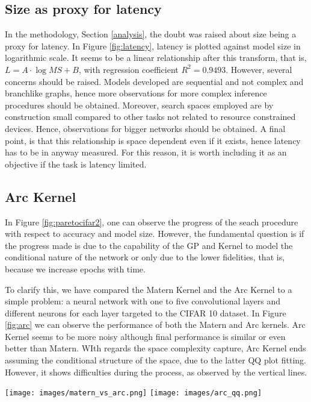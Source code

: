 \documentclass[10pt, a4paper, twocolumn]{article}
\begin{document}
\subsection{Size as proxy for latency}

In the methodology, Section \ref{analysis}, the doubt was raised about size being a proxy for latency. In Figure \ref{fig:latency}, latency is plotted against model size in logarithmic scale. It seems to be a linear relationship after this transform, that is, $L = A\cdot \log{MS} + B$, with regression coefficient $R^{2} = 0.9493$. However, several concerns should be raised. Models developed are sequential and not complex and branchlike graphs, hence more observations for more complex inference procedures should be obtained. Moreover, search spaces employed are by construction small compared to other tasks not related to resource constrained devices. Hence, observations for bigger networks should be obtained. A final point, is that this relationship is space dependent even if it exists, hence latency has to be in anyway measured. For this reason, it is worth including it as an objective if the task is latency limited.




\subsection{Arc Kernel}

In Figure \ref{fig:paretocifar2}, one can observe the progress of the seach procedure with respect to accuracy and model size. However, the fundamental question is if the progress made is due to the capability of the GP and Kernel to model the conditional nature of the network or only due to the lower fidelities, that is, because we increase epochs with time. 

To clarify this, we have compared the Matern Kernel and  the Arc Kernel to a simple problem: a neural network with one to five convolutional layers and different neurons for each layer targeted to the CIFAR 10 dataset. In Figure \ref{fig:arc} we can observe the performance of both the Matern and Arc kernels. Arc Kernel seems to be more noisy although final performance is similar or even better than Matern. WIth regards the space complexity capture, Arc Kernel ends assuming the conditional structure of the space, due to the latter QQ plot fitting. However, it shows difficulties during the process, as observed by the vertical lines. 

\begin{figure*}
	\centering
\texttt{[image: images/matern\_vs\_arc.png]}
\texttt{[image: images/arc\_qq.png]}
\caption{Left: evolution of performance of a CNN with variable layers in a bayesian optimization procedure with a GP based on Arc (blue) and Matern (red). Vertical bars indicate standard deviation of the different evaluations inside the same step. Right: Prediction values of the GP for each evaluation step and the real observed values (by evaluating the network)}
\label{fig:arc}
\end{figure*}
\end{document}

